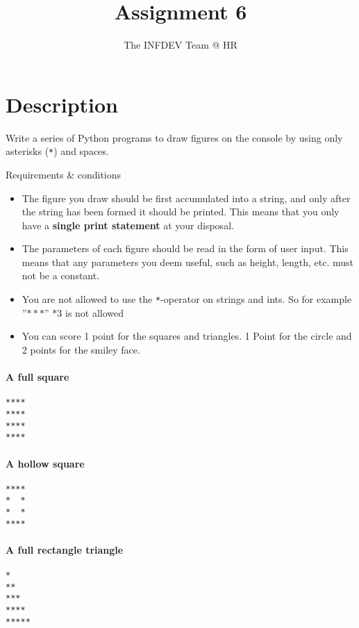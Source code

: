\documentclass[10pt,a4paper,final]{article}
\author{The INFDEV Team @ HR}
\title{Assignment 6}
\begin{document}
\section{Description}
Write a series of Python programs to draw figures on the console by using only asterisks (\texttt{*}) and spaces.

{\large Requirements \& conditions}
\begin{itemize}
\item The figure you draw should be first accumulated into a string, and only after the string has been formed it should be printed. This means that you only have a \textbf{single print statement} at your disposal.
\item The parameters of each figure should be read in the form of user input. This means that any parameters you deem useful, such as height, length, etc. must not be a constant.
\item You are not allowed to use the \texttt{*}-operator on strings and ints. So for example ''$***$'' $* 3$ is not allowed
\item You can score 1 point for the squares and triangles. 1 Point for the circle and 2 points for the smiley face.

\end{itemize}


\paragraph{A full square}
\begin{minipage}[c]{0.30\textwidth}

\begin{lstlisting}
****
****
****
****
\end{lstlisting}
\end{minipage}


\paragraph{A hollow square}
\begin{minipage}[c]{0.30\textwidth}
\begin{lstlisting}
****
*  *
*  *
****
\end{lstlisting}
\end{minipage}


\paragraph{A full rectangle triangle}
\begin{minipage}[c]{0.30\textwidth}

\begin{lstlisting}
*
**
***
****
*****
\end{lstlisting}
\end{minipage}
\end{document}
